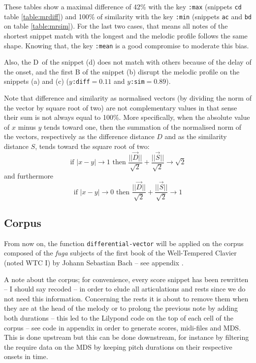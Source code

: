 These tables show a maximal difference of 42\% with the key \texttt{:max} (snippets \texttt{cd} table \ref{table:mrdiff}) and 100\% of similarity with the key \texttt{:min} (snippets \texttt{ac} and \texttt{bd} on table \ref{table:mrsim}).
For the last two cases, that means all notes of the shortest snippet match with the longest and the melodic profile follows the same shape. Knowing that, the key \texttt{:mean} is a good compromise to moderate this bias. 

Also, the \textsf{D}\sh \  of the snippet (d) does not match with others because of the delay of the onset, and the first \textsf{B} of the snippet (b) disrupt the melodic profile on the snippets (a) and (c) ($y$\texttt{:diff}$=0.11$ and $y$\texttt{:sim}$=0.89$).

Note that difference and similarity as normalised vectors (by dividing the norm of the vector by square root of two) are not complementary values in that sense their sum is not always equal to 100\%. More specifically, when the absolute value of $x$ minus $y$ tends toward one, then the summation of the normalised norm of the vectors, respectively as the difference distance $D$ and as the similarity distance $S$, tends toward the square root of two:
$$\text{if } |x-y| \to 1 \text{ then } \frac{||\overrightarrow{D}||}{\sqrt{2}} + \frac{||\overrightarrow{S}||}{\sqrt{2}} \to \sqrt{2}$$
 and furthermore
 $$\text{if } |x-y| \to 0 \text{ then } \frac{||\overrightarrow{D}||}{\sqrt{2}} + \frac{||\overrightarrow{S}||}{\sqrt{2}} \to 1$$
 
 \subsection{Corpus}
 
 From now on, the function \texttt{differential-vector} will be applied on the corpus composed of the \textit{fuga} subjects of the first book of the Well-Tempered Clavier (noted WTC I) by Johann Sebastian Bach -- see appendix .

\smallskip

A note about the corpus; for convenience, every score snippet has been rewritten -- I should say recoded -- in order to elude all articulations and rests since we do not need this information. Concerning the rests it is about to remove them when they are at the head of the melody or to prolong the previous note by adding both durations -- this led to the Lilypond code on the top of each cell of the corpus -- see code in appendix  in order to generate scores, midi-files and MDS. This is done upstream but this can be done downstream, for instance by filtering the require data on the MDS by keeping pitch durations on their respective onsets in time. 


